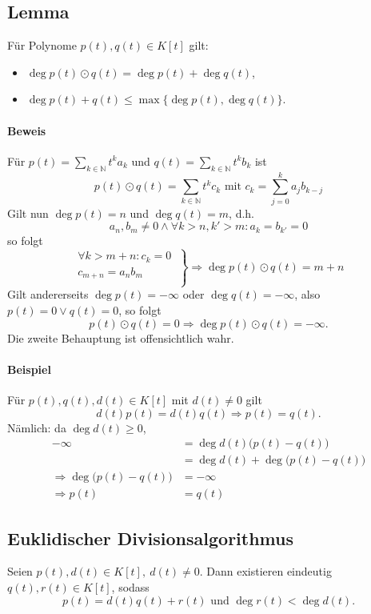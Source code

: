 \subsection{Lemma}
	\begin{Lemma}
		Für Polynome $ p(t), q(t)\in K[t] $ gilt:
			\begin{itemize}
				\item $ \deg p(t)\odot q(t) = \deg p(t)+\deg q(t) $,
				\item $ \deg p(t)+q(t) \leq \max\{\deg p(t), \deg q(t)\} $.
			\end{itemize}
	\end{Lemma}
\paragraph{Beweis}
	Für $ p(t) = \sum_{k\in\mathbb{N}}t^ka_k $ und $ q(t) = \sum_{k\in\mathbb{N}}t^kb_k $ ist
		\[ p(t)\odot q(t) = \sum_{k\in\mathbb{N}}t^kc_k \text{ mit } c_k = \sum_{j=0}^{k}a_jb_{k-j} \]
	Gilt nun $ \deg p(t) = n $ und $ \deg q(t) = m $, d.h.
		\[ a_n,b_m \neq 0 \land \forall k>n, k'>m:a_k = b_{k'}=0 \] 
	so folgt
		\[ \left.
		\begin{aligned}
		\forall k>m+n : c_k = 0\ \\
		        c_{m+n} = a_nb_m\ \\
		\end{aligned}
		 \right\}
		\Rightarrow \deg p(t)\odot q(t) = m+n \]
	Gilt andererseits $ \deg p(t) = -\infty $ oder $ \deg q(t) = -\infty $, also $ p(t) = 0 \lor q(t) = 0 $,
	so folgt
		\[ p(t)\odot q(t) = 0 \Rightarrow \deg p(t)\odot q(t) = -\infty. \]
	Die zweite Behauptung ist offensichtlich wahr.


\paragraph{Beispiel}
	Für $ p(t),q(t),d(t)\in K[t] $ mit $ d(t)\neq 0 $ gilt
		\[ d(t)p(t) = d(t)q(t)\Rightarrow p(t)=q(t). \]
	Nämlich: da $ \deg d(t) \geq 0$,
		\begin{align*}
			-\infty &= \deg d(t)\big(p(t)-q(t)\big)\\
			&= \deg d(t)+ \deg\big(p(t)-q(t)\big)\\
			\Rightarrow \deg\big(p(t)-q(t)\big) &= -\infty\\
			\Rightarrow p(t)&=q(t)
		\end{align*}
\subsection{Euklidischer Divisionsalgorithmus}
	\begin{Satz}
	Seien $ p(t), d(t) \in K[t],\ d(t) \neq 0$. Dann existieren eindeutig $ q(t), r(t) \in K[t] $, sodass
		\[ p(t)= d(t)q(t) + r(t) \text{ und } \deg r(t) < \deg d(t). \]
	\end{Satz}
